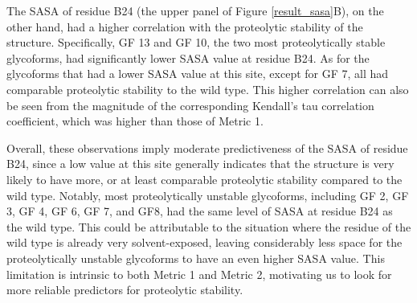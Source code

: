 \documentclass[9pt]{elife}
\begin{document}
The SASA of residue B24 (the upper panel of Figure \ref{result_sasa}B), on the other hand, had a higher correlation with the proteolytic stability of the structure. Specifically, GF 13 and GF 10, the two most proteolytically stable glycoforms, had significantly lower SASA value at residue B24. As for the glycoforms that had a lower SASA value at this site, except for GF 7, all had comparable proteolytic stability to the wild type. This higher correlation can also be seen from the magnitude of the corresponding Kendall's tau correlation coefficient, which was higher than those of Metric 1.

Overall, these observations imply moderate predictiveness of the SASA of residue B24, since a low value at this site generally indicates that the structure is very likely to have more, or at least comparable proteolytic stability compared to the wild type. Notably, most proteolytically unstable glycoforms, including GF 2, GF 3, GF 4, GF 6, GF 7, and GF8, had the same level of SASA at residue B24 as the wild type. This could be attributable to the situation where the residue of the wild type is already very solvent-exposed, leaving considerably less space for the proteolytically unstable glycoforms to have an even higher SASA value. This limitation is intrinsic to both Metric 1 and Metric 2, motivating us to look for more reliable predictors for proteolytic stability. 
\end{document}
